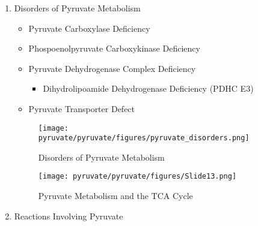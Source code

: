 \documentclass{scrartcl}
\begin{document}
\begin{center}
\setatomsep{1.8em}
\hspace{20}
\end{center}
\begin{enumerate}
\item Disorders of Pyruvate Metabolism
\label{sec:org0b6f95a}
\begin{itemize}
\item Pyruvate Carboxylase Deficiency
\item Phospoenolpyruvate Carboxykinase Deficiency
\item Pyruvate Dehydrogenase Complex Deficiency
\begin{itemize}
\item Dihydrolipoamide Dehydrogenase Deficiency (PDHC E3)
\end{itemize}
\item Pyruvate Transporter Defect
\end{itemize}

\begin{figure}[htbp]
\centering
\texttt{[image: pyruvate/pyruvate/figures/pyruvate\_disorders.png]}
\caption[TCA]{\label{fig:orgb56556f}Disorders of Pyruvate Metabolism}
\end{figure}


\begin{figure}[htbp]
\centering
\texttt{[image: pyruvate/pyruvate/figures/Slide13.png]}
\caption[TCA]{\label{fig:orgbaaaa9c}Pyruvate Metabolism and the TCA Cycle}
\end{figure}

\item Reactions Involving Pyruvate
\label{sec:orgb6f3d05}





\end{enumerate}
\end{document}
